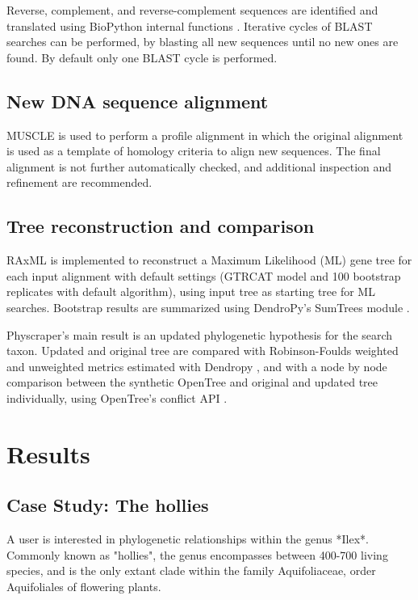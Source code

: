 \documentclass{bmcart}
\begin{document}
Reverse, complement, and reverse-complement sequences are identified and translated
using BioPython internal functions \cite{cock2009biopython}.
Iterative cycles of BLAST searches can be performed, by blasting all new sequences
until no new ones are found. By default only one BLAST cycle is performed.

\subsection*{New DNA sequence alignment}

MUSCLE \cite{edgar2004muscle} is used to perform a profile alignment in which the
original alignment is used as a template of homology criteria to align new sequences.
The final alignment is not further automatically checked, and additional inspection
and refinement are recommended.

\subsection*{Tree reconstruction and comparison}

RAxML \cite{stamatakis2014raxml} is implemented to reconstruct a Maximum Likelihood
(ML) gene tree for each input alignment with default settings (GTRCAT model and
100 bootstrap replicates with default algorithm), using input tree as starting
tree for ML searches.
Bootstrap results are summarized using DendroPy's SumTrees module
\cite{sukumaran2010dendropy}.

Physcraper's main result is an updated phylogenetic hypothesis for the search taxon.
Updated and original tree are compared with Robinson-Foulds weighted and unweighted
metrics estimated with Dendropy \cite{sukumaran2010dendropy}, and with a node by node
comparison between the synthetic OpenTree and original and updated tree individually,
using OpenTree's conflict API \cite{redelings2017supertree}.



\section*{Results}
\subsection*{Case Study: The hollies}

A user is interested in phylogenetic relationships within the genus *Ilex*. Commonly
known as "hollies", the genus encompasses between 400-700 living species, and is
the only extant clade within the family Aquifoliaceae, order Aquifoliales of flowering
plants.
\end{document}
